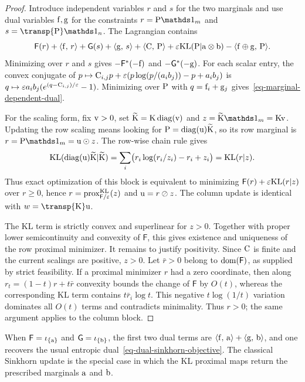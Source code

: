\begin{proof}
Introduce independent variables $r$ and $s$ for the two marginals and use dual variables $\fD,\gD$ for the constraints $r=\P\ones_m$ and $s=\transp{\P}\ones_n$. The Lagrangian contains
\[
	\mathsf F(r)+\dotp{\fD}{r}
	+
	\mathsf G(s)+\dotp{\gD}{s}
	+
	\dotp{\C}{\P}
	+
	\epsilon\KLD(\P|\a\otimes\b)
	-
	\dotp{\fD\oplus\gD}{\P}.
\]
Minimizing over $r$ and $s$ gives $-\mathsf F^*(-\fD)$ and $-\mathsf G^*(-\gD)$. For each scalar entry, the convex conjugate of $p\mapsto \C_{i,j}p+\epsilon(p\log(p/(a_i b_j))-p+a_i b_j)$ is $q\mapsto \epsilon a_i b_j(e^{(q-\C_{i,j})/\epsilon}-1)$. Minimizing over $\P$ with $q=\fD_i+\gD_j$ gives~\eqref{eq-marginal-dependent-dual}.

For the scaling form, fix $\vD>0$, set $\widetilde{\K}=\K\diag(\vD)$ and $z=\widetilde{\K}\ones_m=\K\vD$. Updating the row scaling means looking for $\P=\diag(\uD)\widetilde{\K}$, so its row marginal is $r=\P\ones_m=\uD\odot z$. The row-wise chain rule gives
\[
	\KLD(\diag(\uD)\widetilde{\K}|\widetilde{\K})
	=
	\sum_i \bigl(r_i\log(r_i/z_i)-r_i+z_i\bigr)
	=
	\KLD(r|z).
\]
Thus exact optimization of this block is equivalent to minimizing $\mathsf F(r)+\epsilon\KLD(r|z)$ over $r\geq0$, hence $r=\prox_{\mathsf F/\epsilon}^{\KLD}(z)$ and $\uD=r\oslash z$. The column update is identical with $w=\transp{\K}\uD$.

	The KL term is strictly convex and superlinear for $z>0$. Together with proper lower semicontinuity and convexity of $\mathsf F$, this gives existence and uniqueness of the row proximal minimizer. It remains to justify positivity. Since $\C$ is finite and the current scalings are positive, $z>0$. Let $\bar r>0$ belong to $\dom(\mathsf F)$, as supplied by strict feasibility. If a proximal minimizer $r$ had a zero coordinate, then along $r_t=(1-t)r+t\bar r$ convexity bounds the change of $\mathsf F$ by $O(t)$, whereas the corresponding KL term contains $t\bar r_i\log t$. This negative $t\log(1/t)$ variation dominates all $O(t)$ terms and contradicts minimality. Thus $r>0$; the same argument applies to the column block.
\end{proof}

When $\mathsf F=\iota_{\{\a\}}$ and $\mathsf G=\iota_{\{\b\}}$, the first two dual terms are $\dotp{\fD}{\a}+\dotp{\gD}{\b}$, and one recovers the usual entropic dual~\eqref{eq-dual-sinkhorn-objective}. The classical Sinkhorn update is the special case in which the KL proximal maps return the prescribed marginals $\a$ and $\b$.

